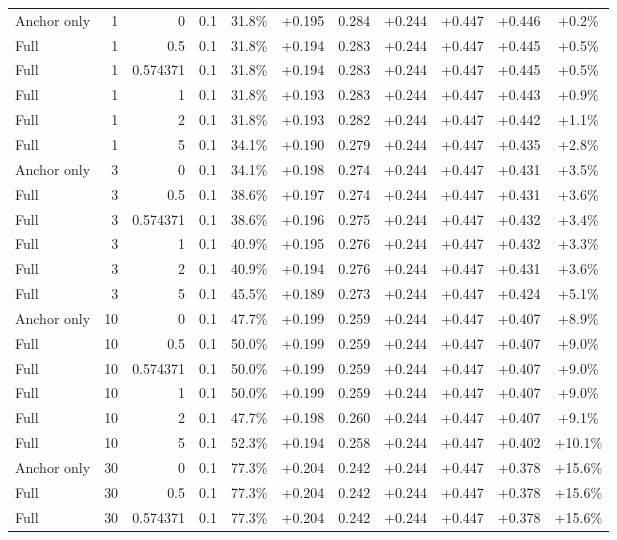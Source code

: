 \begin{table}[htbp]
\begin{tabular}{lrrrccccccc}
Anchor only & 1 & 0 & 0.1 & 31.8\% & +0.195 & 0.284 & +0.244 & +0.447 & +0.446 & +0.2\% \\
Full & 1 & 0.5 & 0.1 & 31.8\% & +0.194 & 0.283 & +0.244 & +0.447 & +0.445 & +0.5\% \\
Full & 1 & 0.574371 & 0.1 & 31.8\% & +0.194 & 0.283 & +0.244 & +0.447 & +0.445 & +0.5\% \\
Full & 1 & 1 & 0.1 & 31.8\% & +0.193 & 0.283 & +0.244 & +0.447 & +0.443 & +0.9\% \\
Full & 1 & 2 & 0.1 & 31.8\% & +0.193 & 0.282 & +0.244 & +0.447 & +0.442 & +1.1\% \\
Full & 1 & 5 & 0.1 & 34.1\% & +0.190 & 0.279 & +0.244 & +0.447 & +0.435 & +2.8\% \\
Anchor only & 3 & 0 & 0.1 & 34.1\% & +0.198 & 0.274 & +0.244 & +0.447 & +0.431 & +3.5\% \\
Full & 3 & 0.5 & 0.1 & 38.6\% & +0.197 & 0.274 & +0.244 & +0.447 & +0.431 & +3.6\% \\
Full & 3 & 0.574371 & 0.1 & 38.6\% & +0.196 & 0.275 & +0.244 & +0.447 & +0.432 & +3.4\% \\
Full & 3 & 1 & 0.1 & 40.9\% & +0.195 & 0.276 & +0.244 & +0.447 & +0.432 & +3.3\% \\
Full & 3 & 2 & 0.1 & 40.9\% & +0.194 & 0.276 & +0.244 & +0.447 & +0.431 & +3.6\% \\
Full & 3 & 5 & 0.1 & 45.5\% & +0.189 & 0.273 & +0.244 & +0.447 & +0.424 & +5.1\% \\
Anchor only & 10 & 0 & 0.1 & 47.7\% & +0.199 & 0.259 & +0.244 & +0.447 & +0.407 & +8.9\% \\
Full & 10 & 0.5 & 0.1 & 50.0\% & +0.199 & 0.259 & +0.244 & +0.447 & +0.407 & +9.0\% \\
Full & 10 & 0.574371 & 0.1 & 50.0\% & +0.199 & 0.259 & +0.244 & +0.447 & +0.407 & +9.0\% \\
Full & 10 & 1 & 0.1 & 50.0\% & +0.199 & 0.259 & +0.244 & +0.447 & +0.407 & +9.0\% \\
Full & 10 & 2 & 0.1 & 47.7\% & +0.198 & 0.260 & +0.244 & +0.447 & +0.407 & +9.1\% \\
Full & 10 & 5 & 0.1 & 52.3\% & +0.194 & 0.258 & +0.244 & +0.447 & +0.402 & +10.1\% \\
Anchor only & 30 & 0 & 0.1 & 77.3\% & +0.204 & 0.242 & +0.244 & +0.447 & +0.378 & +15.6\% \\
Full & 30 & 0.5 & 0.1 & 77.3\% & +0.204 & 0.242 & +0.244 & +0.447 & +0.378 & +15.6\% \\
Full & 30 & 0.574371 & 0.1 & 77.3\% & +0.204 & 0.242 & +0.244 & +0.447 & +0.378 & +15.6\% \\

\end{tabular}
\end{table}
